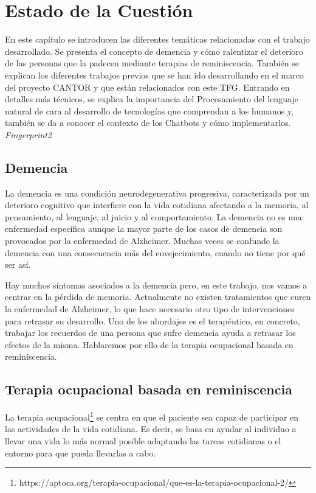 \chapter{Estado de la Cuestión}
\label{cap:estadoDeLaCuestion}

En este capítulo se introducen las diferentes temáticas relacionadas con el trabajo desarrollado. Se presenta el concepto de demencia y cómo ralentizar el deterioro de las personas que la padecen mediante terapias de reminiscencia. También se explican los diferentes trabajos previos que se han ido desarrollando en el marco del proyecto CANTOR y que están relacionados con este TFG. Entrando en detalles más técnicos, se explica la importancia del Procesamiento del lenguaje natural de cara al desarrollo de tecnologías que comprendan a los humanos y, también se da a conocer el contexto de los Chatbots y cómo implementarlos. \textit{Fingerprint2} \cite{fingerprintjs2}


\section{Demencia}
La demencia\cite{demencia} es una condición neurodegenerativa progresiva, caracterizada por un deterioro cognitivo que interfiere con la vida cotidiana afectando a la memoria, al pensamiento, al lenguaje, al juicio y al comportamiento. La demencia no es una enfermedad específica aunque la mayor parte de los casos de demencia son provocados por la enfermedad de Alzheimer. Muchas veces se confunde la demencia con una consecuencia más del envejecimiento, cuando no tiene por qué ser así.

Hay muchos síntomas asociados a la demencia pero, en este trabajo, nos vamos a centrar en la pérdida de memoria. Actualmente no existen tratamientos que curen la enfermedad de Alzheimer, lo que hace necesario otro tipo de intervenciones para retrasar su desarrollo. Uno de los abordajes es el terapéutico, en concreto, trabajar los recuerdos de una persona que sufre demencia ayuda a retrasar los efectos de la misma. Hablaremos por ello de la terapia ocupacional basada en reminiscencia.

\section{Terapia ocupacional basada en reminiscencia}
La terapia ocupacional\footnote{https://aptoca.org/terapia-ocupacional/que-es-la-terapia-ocupacional-2/} se centra en que el paciente sea capaz de participar en las actividades de la vida cotidiana. Es decir, se basa en ayudar al individuo a llevar una vida lo más normal posible adaptando las tareas cotidianas o el entorno para que pueda llevarlas a cabo.

